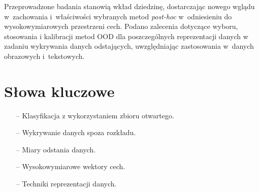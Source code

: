 Przeprowadzone badania stanowią wkład dziedzinę, dostarczając nowego wglądu w~zachowania i~właściwości wybranych metod \textit{post-hoc} w~odniesieniu do wysokowymiarowych przestrzeni cech. Podano zalecenia dotyczące wyboru, stosowania i kalibracji metod OOD dla poszczególnych reprezentacji danych w zadaniu wykrywania danych odstających, uwzględniając zastosowania w~danych obrazowych i~tekstowych.


\section*{Słowa kluczowe}
\label{section:slowa-kluczowe}

\begin{itemize}
    \item[–] Klasyfikacja z wykorzystaniem zbioru otwartego.
    \item[–] Wykrywanie danych spoza rozkładu.
    \item[–] Miary odstania danych.
    \item[–] Wysokowymiarowe wektory cech.
    \item[–] Techniki reprezentacji danych.
\end{itemize}
